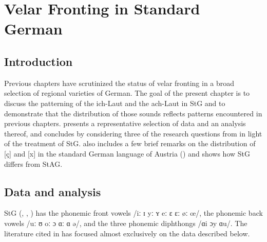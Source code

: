 \chapter{Velar Fronting in Standard German}\label{sec:17}

\begin{epigraphs}

\end{epigraphs}


\section{{Introduction}}\label{sec:17.1}

Previous chapters have scrutinized the status of velar fronting in a broad selection of regional varieties of German. The goal of the present chapter is to discuss the patterning of the ich-Laut and the ach-Laut in StG and to demonstrate that the distribution of those sounds reflects patterns encountered in previous chapters.  presents a representative selection of data and an analysis thereof, and  concludes by considering three of the research questions from  in light of the treatment of StG.  also includes a few brief remarks on the distribution of [ç] and [x] in the standard German language of Austria () and shows how StG differs from StAG.

\section{{Data} {and} {analysis}}\label{sec:17.2}

StG (\citealt{Siebs1969}, \citealt{Krech1982}, \citealt{Mangold2005}) has the phonemic front vowels  /iː ɪ yː ʏ eː ɛ ɛː øː œ/, the phonemic back vowels /uː ʊ oː ɔ ɑː ɑ ə/, and the three phonemic diphthongs /ɑi ɔy ɑu/. The literature cited in  has focused almost exclusively on the data described below.

